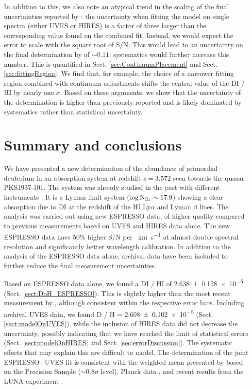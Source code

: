 \documentclass[fleqn,usenatbib]{mnras}
\makeatletter
\DeclareRobustCommand{\ion}[2]{%
  \mbox{#1\check@mathfonts\fontsize\sf@size\z@\selectfont #2}%
}
\DeclareRobustCommand{\kms}[1]{\SI{#1}{\km\per\second}}
\makeatother
\begin{document}
In addition to this, we also note an atypical trend in the scaling of the final uncertainties reported by : the uncertainty when fitting the model on single spectra (either UVES or HIRES) is a factor of three larger than the corresponding value found on the combined fit. Instead, we would expect the error to scale with the square root of S/N. This would lead to an uncertainty on the final determination by  of $\sim0.11$: systematics would further increase this number. This is quantified in Sect. \ref{sec:ContinuumPlacement} and Sect. \ref{sec:fittingRegion}. We find that, for example, the choice of a narrower fitting region combined with continuum adjustments shifts the central value of the \ion{D}{I}/\ion{H}{I} by nearly one $\sigma$. Based on these arguments, we show that the uncertainty of the determination is higher than previously reported and is likely dominated by systematics rather than statistical uncertainty.

\section{Summary and conclusions}
We have presented a new determination of the abundance of primordial deuterium in an absorption system at redshift $z=3.572$ seen towards the quasar PKS1937-101. The system was already studied in the past with different instruments \citep{tytler_96, burles_tytler_98, RS_17}. It is a Lyman limit system ($\log{\rm N_{H_I} \sim 17.9}$) showing a clear absorption due to \ion{D}{I} at the redshift of the \ion{H}{I} Ly$\alpha$ and Lyman $\beta$ lines. The analysis was carried out using new ESPRESSO data, of higher quality compared to previous measurements based on UVES and HIRES data alone. The new ESPRESSO data have 50\% higher S/N per \kms{} at almost double spectral resolution and significantly better wavelength calibration. In addition to the analysis of the ESPRESSO data alone, archival data have been included to further reduce the final measurement uncertainties.

Based on ESPRESSO data alone, we found a \ion{D}{I}/\ion{H}{I} of \num{2.638 \pm 0.128e-5} (Sect. \ref{sect:DoH_ESPRESSO}). This is slightly higher than the most recent measurement by , although consistent within the respective error bars.
Including archival UVES data, we found \ion{D}{}/\ion{H}{} = \num{2.608 \pm 0.102e-5} (Sect. \ref{sect:modelOnUVES}), while the inclusion of HIRES data did not decrease the uncertainty, possibly indicating that we have reached the limit of statistical errors (Sect. \ref{sect:modelOnHIRES} and Sect. \ref{sec:errorDiscussion}). The systematic effects that may explain this are difficult to model.
The determination of the joint ESPRESSO+UVES fit is consistent with the weighted mean presented by \citet{cooke_18} based on the Precision Sample ($\sim 0.8 \sigma$ level), Planck data \citep[$0.2, 1.2, 1.3 \sigma$ level,][]{Planck_2018_cosmo_pars}, and recent results from the LUNA experiment \citep[$\sim 0.7 \sigma$ level,][]{luna_deuterium}.
\end{document}
